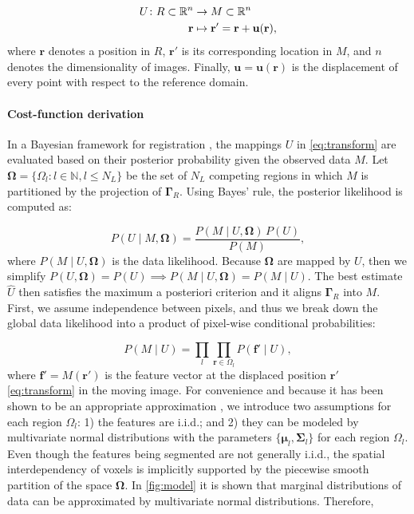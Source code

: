 \documentclass[3p,authoryear,fleqn]{elsarticle}
\providecommand{\omegaset}{\ensuremath{\boldsymbol{\Omega}}}
\providecommand{\gammaset}{\ensuremath{\boldsymbol{\Gamma}}}
\renewcommand{\vec}[1]{\mathbf{#1}}
\begin{document}
  \begin{align}
  U\colon R \subset \mathbb{R}^n &\to M \subset \mathbb{R}^n \notag\\
  \vec{r} &\mapsto \vec{r}' =\vec{r}+\vec{u}(\vec{r}),
  \label{eq:transform}
  \end{align}
  where $\vec{r}$ denotes a position in $R$, $\vec{r}'$ is
  its corresponding location in $M$, and $n$ denotes the dimensionality of images.
Finally, $\vec{u} = \vec{u}(\vec{r})$ is the displacement of every point with respect
  to the reference domain.

\paragraph*{Cost-function derivation}
In a Bayesian framework for registration \citep{wyatt_map_2003,pohl_bayesian_2006,gass_simultaneous_2014},
  the mappings $U$ in \eqref{eq:transform} are
  evaluated based on their posterior probability given the observed data
  $M$.
Let $\omegaset = \{\Omega_l: l \in \mathbb{N}, l \leq N_L\}$ be the set of $N_L$ competing regions in
  which $M$ is partitioned by the projection of $\gammaset_R$.
Using Bayes' rule, the posterior likelihood is computed as:

  \begin{equation}
  P(U \mid M, \omegaset ) = \frac{P(M \mid U,\omegaset )\, P(U)}{P(M)},
  \label{eq:bayes_rule}
  \end{equation}
  where $P(M \mid U,\omegaset)$ is the data likelihood.
Because $\omegaset$ are mapped by $U$, then we simplify
  $P(U, \omegaset) = P(U) \implies P(M \mid U,\omegaset) = P(M \mid U)$.
The best estimate $\hat{U}$ then satisfies the maximum a posteriori criterion
  \citep{bishop_pattern_2006} and it aligns $\gammaset_R$ into $M$.
First, we assume independence between pixels, and thus we break down the
  global data likelihood into a product of pixel-wise conditional probabilities:

  \begin{equation}
  P(M \mid U) = \underset{l}{\prod} \underset{\vec{r}\in \Omega_l}{\prod}
    P\left( \vec{f}' \mid U \right),
  \label{eq:bayes_aposteriori}
  \end{equation}
  where $\vec{f}' = M(\vec{r}')$ is the feature vector at the displaced
  position $\vec{r}'$ \eqref{eq:transform} in the moving image.
For convenience and because it has been shown to be an appropriate approximation
  \citep{leemput_automated_1999,cuadra_comparison_2005}, we introduce two assumptions for each
  region $\Omega_l$:
  1) the features are i.i.d.; and 2) they can be modeled by multivariate normal
  distributions with the parameters $\lbrace \boldsymbol{\mu}_l, \boldsymbol{\Sigma}_{l} \rbrace$
  for each region $\Omega_l$.
Even though the features being segmented are not generally i.i.d., the spatial interdependency of
  voxels is implicitly supported by the piecewise smooth partition of the space \omegaset{}.
In \autoref{fig:model} it is shown that marginal distributions of data can be approximated by
  multivariate normal distributions. Therefore,
\end{document}
